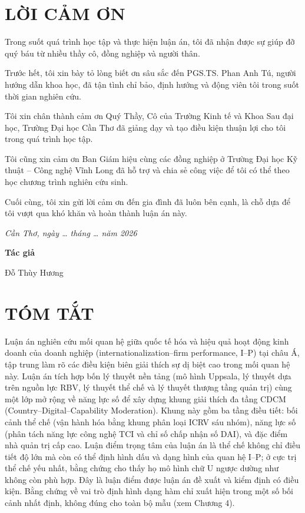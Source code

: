 \documentclass[
  a4paper,
  13pt]{extreport}
\begin{document}
\vspace{0.8cm}

\newpage
{}

\hypertarget{lux1eddi-cux1ea3m-ux1a1n}{%
\section*{LỜI CẢM ƠN}\label{lux1eddi-cux1ea3m-ux1a1n}}

Trong suốt quá trình học tập và thực hiện luận án, tôi đã nhận được sự
giúp đỡ quý báu từ nhiều thầy cô, đồng nghiệp và người thân.

Trước hết, tôi xin bày tỏ lòng biết ơn sâu sắc đến PGS.TS. Phan Anh Tú,
người hướng dẫn khoa học, đã tận tình chỉ bảo, định hướng và động viên
tôi trong suốt thời gian nghiên cứu.

Tôi xin chân thành cảm ơn Quý Thầy, Cô của Trường Kinh tế và Khoa Sau
đại học, Trường Đại học Cần Thơ đã giảng dạy và tạo điều kiện thuận lợi
cho tôi trong quá trình học tập.

Tôi cũng xin cảm ơn Ban Giám hiệu cùng các đồng nghiệp ở Trường Đại học
Kỹ thuật -- Công nghệ Vĩnh Long đã hỗ trợ và chia sẻ công việc để tôi có
thể theo học chương trình nghiên cứu sinh.

Cuối cùng, tôi xin gửi lời cảm ơn đến gia đình đã luôn bên cạnh, là chỗ
dựa để tôi vượt qua khó khăn và hoàn thành luận án này.

\emph{Cần Thơ, ngày \ldots{} tháng \ldots{} năm 2026}

\textbf{Tác giả}

Đỗ Thùy Hương

\newpage

\hypertarget{tuxf3m-tux1eaft}{%
\section*{TÓM TẮT}\label{tuxf3m-tux1eaft}}

Luận án nghiên cứu mối quan hệ giữa quốc tế hóa và hiệu quả hoạt động
kinh doanh của doanh nghiệp (internationalization--firm performance,
I--P) tại châu Á, tập trung làm rõ các điều kiện biên giải thích sự dị
biệt cao trong mối quan hệ này. Luận án tích hợp bốn lý thuyết nền tảng
(mô hình Uppsala, lý thuyết dựa trên nguồn lực RBV, lý thuyết thể chế và
lý thuyết thượng tầng quản trị) cùng một lớp mở rộng về năng lực số để
xây dựng khung giải thích đa tầng CDCM (Country--Digital--Capability
Moderation). Khung này gồm ba tầng điều tiết: bối cảnh thể chế (vận hành
hóa bằng khung phân loại ICRV sáu nhóm), năng lực số (phân tách năng lực
công nghệ TCI và chỉ số chấp nhận số DAI), và đặc điểm nhà quản trị cấp
cao. Luận điểm trọng tâm của luận án là thể chế không chỉ điều tiết độ
lớn mà còn có thể định hình dấu và dạng hình của quan hệ I--P; ở cực trị
thể chế yếu nhất, bằng chứng cho thấy họ mô hình chữ U ngược dường như
không còn phù hợp. Đây là luận điểm được luận án đề xuất và kiểm định có
điều kiện. Bằng chứng về vai trò định hình dạng hàm chỉ xuất hiện trong
một số bối cảnh nhất định, không đúng cho toàn bộ mẫu (xem Chương 4).
\end{document}
